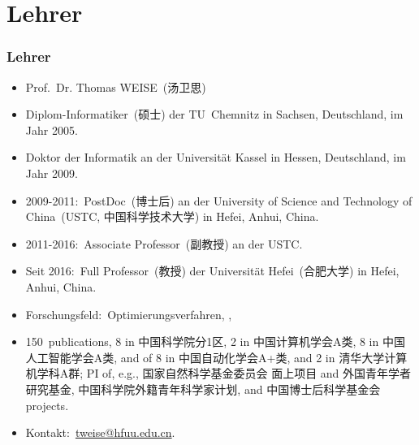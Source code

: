 \documentclass[aspectratio=169,mathserif,notheorems]{beamer}%
\begin{document}
\section{Lehrer}%
%
\begin{frame}[t]%
\frametitle{Lehrer}%
\begin{itemize}%
%
\item Prof.~Dr. Thomas WEISE~(汤卫思)%
%
\item<2-> Diplom-Informatiker~(硕士) der TU~Chemnitz in Sachsen, Deutschland, im Jahr 2005.%
%
\item<15-> Doktor der Informatik an der Universität Kassel in Hessen, Deutschland, im Jahr 2009.
%
\item<25-> 2009-2011:~PostDoc~(博士后) an der University of Science and Technology of China~(USTC, 中国科学技术大学) in Hefei, Anhui, China.%
%
\item<38-> 2011-2016:~Associate Professor~(副教授) an der USTC.%
%
\item<39-> Seit 2016:~Full Professor~(教授) der Universität Hefei~(合肥大学) in Hefei, Anhui, China.%
%
\item<40-> Forschungsfeld:~Optimierungsverfahren, , %
%
\item<41-> 150~publications, 8 in 中国科学院分1区, 2 in 中国计算机学会A类, 8 in 中国人工智能学会A类, and of 8 in 中国自动化学会A+类, and 2 in 清华大学计算机学科A群; PI of, e.g., 国家自然科学基金委员会 面上项目 and 外国青年学者研究基金, 中国科学院外籍青年科学家计划, and 中国博士后科学基金会 projects.%
%
\item<42-> Kontakt:~\href{mailto:tweise@hfuu.edu.cn}{tweise@hfuu.edu.cn}.%
%
\end{itemize}%
%
%
%
%
%
%

\end{frame}
\end{document}
